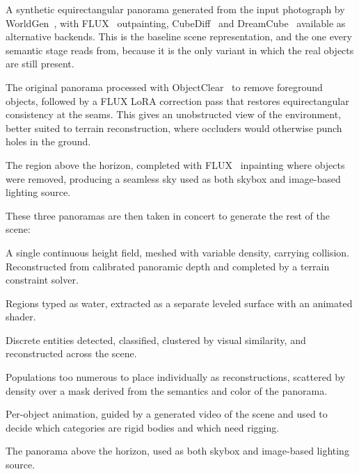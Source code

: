 \begin{description}[leftmargin=1.2em,style=nextline]
  \item[Original Panorama.] A synthetic equirectangular panorama generated from the
  input photograph by WorldGen~\cite{worldgen2025ziyangxie}, with
  FLUX~\cite{esser2024scalingrectifiedflowtransformers} outpainting,
  CubeDiff~\cite{kalischek2025cubediffrepurposingdiffusionbasedimage} and
  DreamCube~\cite{dreamcube} available as alternative backends. This is the
  baseline scene representation, and the one every semantic stage reads from,
  because it is the only variant in which the real objects are still present.
  \item[Object-Removed Panorama.] The original panorama processed with
  ObjectClear~\cite{zhao2026objectclear} to remove foreground objects, followed by
  a FLUX LoRA correction pass that restores equirectangular consistency at the
  seams. This gives an unobstructed view of the environment, better suited to
  terrain reconstruction, where occluders would otherwise punch holes in the ground.
  \item[Sky-Inpainted Panorama.] The region above the horizon, completed with
  FLUX~\cite{esser2024scalingrectifiedflowtransformers} inpainting where objects
  were removed, producing a seamless sky used as both skybox and image-based
  lighting source.
\end{description}

These three panoramas are then taken in concert to generate the rest of the scene:

\begin{description}[leftmargin=1.2em,style=nextline]
  \item[Terrain.] A single continuous height field, meshed with variable density,
  carrying collision. Reconstructed from calibrated panoramic depth and completed
  by a terrain constraint solver.
  \item[Water.] Regions typed as water, extracted as a separate leveled surface
  with an animated shader.
  \item[Objects.] Discrete entities detected, classified, clustered by visual
  similarity, and reconstructed across the scene.
  \item[Ground cover.] Populations too numerous to place individually as
  reconstructions, scattered by density over a mask derived from the semantics and
  color of the panorama.
  \item[Motion.] Per-object animation, guided by a generated video of the scene and
  used to decide which categories are rigid bodies and which need rigging.
  \item[Sky.] The panorama above the horizon, used as both skybox and image-based
  lighting source.
\end{description}

